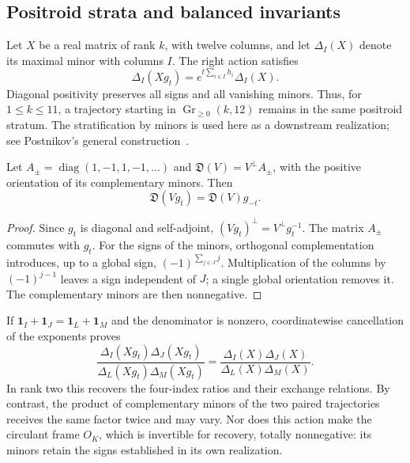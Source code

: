 \subsection{Positroid strata and balanced invariants}

Let \(X\) be a real matrix of rank \(k\), with twelve columns, and let \(\Delta_I(X)\) denote its maximal minor with columns \(I\). The right action satisfies
\begin{equation}
 \Delta_I(Xg_t)=e^{t\sum_{i\in I}h_i}\Delta_I(X).
 \label{rec:eq:plucker}
\end{equation}
Diagonal positivity preserves all signs and all vanishing minors. Thus, for \(1\le k\le11\), a trajectory starting in \(\operatorname{Gr}_{\ge0}(k,12)\) remains in the same positroid stratum. The stratification by minors is used here as a downstream realization; see Postnikov's general construction~\cite{rec:postnikov}.

\begin{proposition}
Let \(A_{\pm}=\operatorname{diag}(1,-1,1,-1,\ldots)\) and
\(\mathfrak D(V)=V^\perp A_{\pm}\), with the positive orientation of its complementary minors. Then
\[
 \mathfrak D(Vg_t)=\mathfrak D(V)g_{-t}.
\]
\end{proposition}
\begin{proof}
Since \(g_t\) is diagonal and self-adjoint,
\((Vg_t)^\perp=V^\perp g_t^{-1}\). The matrix \(A_{\pm}\) commutes with \(g_t\). For the signs of the minors, orthogonal complementation introduces, up to a global sign, \((-1)^{\sum_{j\in J}j}\). Multiplication of the columns by \((-1)^{j-1}\) leaves a sign independent of \(J\); a single global orientation removes it. The complementary minors are then nonnegative.
\end{proof}

If \(\mathbf1_I+\mathbf1_J=\mathbf1_L+\mathbf1_M\) and the denominator is nonzero, coordinatewise cancellation of the exponents proves
\begin{equation}
 \frac{\Delta_I(Xg_t)\Delta_J(Xg_t)}{\Delta_L(Xg_t)\Delta_M(Xg_t)}
 =\frac{\Delta_I(X)\Delta_J(X)}{\Delta_L(X)\Delta_M(X)}.
 \label{rec:eq:cocientes}
\end{equation}
In rank two this recovers the four-index ratios and their exchange relations. By contrast, the product of complementary minors of the two paired trajectories receives the same factor twice and may vary. Nor does this action make the circulant frame \(O_K\), which is invertible for recovery, totally nonnegative: its minors retain the signs established in its own realization.


